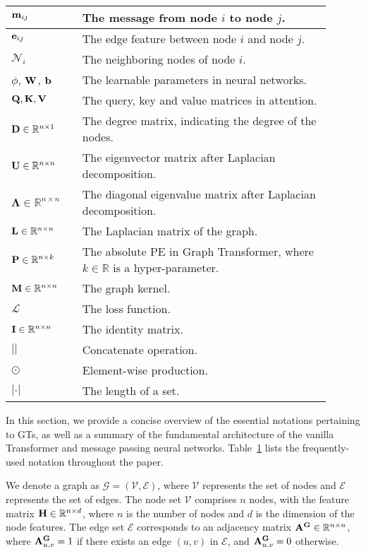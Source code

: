 \begin{table}[htbp!]
\begin{tabular}{m{0.2\linewidth}<{\centering} m{0.7\linewidth}<{\raggedright}}
    $\mathbf{m}_{ij}$   & The message from node $i$ to node $j$. \\ \hline
    $\mathbf{e}_{ij}$   & The edge feature between node $i$ and node $j$. \\ \hline
    $\mathcal{N}_{i}$   & The neighboring nodes of node $i$. \\ \hline
    $\phi$, $\mathbf{W}$, $\mathbf{b}$   & The learnable parameters in neural networks. \\ \hline
    $\mathbf{Q}, \mathbf{K}, \mathbf{V}$   & The query, key and value matrices in attention. \\ \hline
    $\mathbf{D} \in \mathbb R^{n \times 1}$   & The degree matrix, indicating the degree of the nodes. \\ \hline
    $\mathbf{U} \in \mathbb R^{n \times n}$   & The eigenvector matrix after Laplacian decomposition. \\ \hline
    $\mathbf{\Lambda} \in \mathbb R^{n \times n}$   & The diagonal eigenvalue matrix after Laplacian decomposition. \\ \hline
    $\mathbf{L} \in \mathbb R^{n \times n}$   & The Laplacian matrix of the graph. \\ \hline
    $\mathbf{P} \in \mathbb R^{n \times k}$   & The absolute PE in Graph Transformer, where $k \in \mathbb R$  is a hyper-parameter.\\ \hline
    $\mathbf{M} \in \mathbb R^{n \times n}$   & The graph kernel. \\ \hline
    $\mathcal L$   & The loss function. \\ \hline
    
    $\mathbf{I} \in \mathbb R^{n \times n}$   & The identity matrix. \\ \hline
    $||$   & Concatenate operation. \\ \hline
    $\odot $   & Element-wise production. \\ \hline
    $|\cdot|$   & The length of a set. \\ 
    

    \bottomrule
    \end{tabular}%
  \label{tab:notation}%
\end{table}%


In this section, we provide a concise overview of the essential notations pertaining to GTs, as well as a summary of the fundamental architecture of the vanilla Transformer and message passing neural  networks.
Table~\ref{tab:notation} lists the frequently-used notation throughout the paper. 

We denote a graph as $\mathcal G = (\mathcal V, \mathcal E)$, where $\mathcal V$ represents the set of nodes and $\mathcal E$ represents the set of edges. The node set $\mathcal V$ comprises $n$ nodes, with the feature matrix $\mathbf{H} \in \mathbb{R}^{n\times d}$, where $n$ is the number of nodes and $d$ is the dimension of the node features. The edge set $\mathcal E$ corresponds to an adjacency matrix $\mathbf{A}^{\mathbf{G}} \in \mathbb R^{n \times n}$, where $\mathbf{A}^{\mathbf{G}}_{u,v} = 1$ if there exists an edge $(u, v)$ in $\mathcal E$, and $\mathbf{A}^{\mathbf{G}}_{u,v} = 0$ otherwise. 

